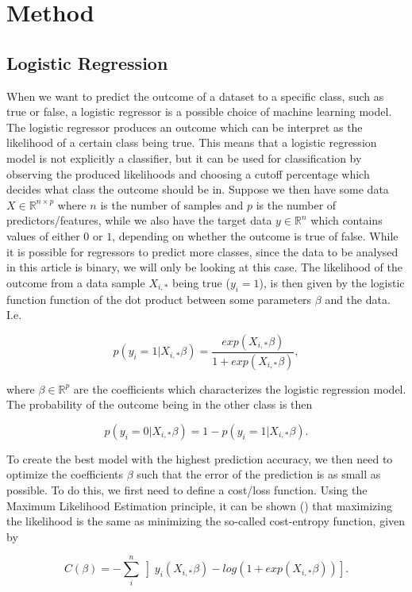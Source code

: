 \documentclass[a4paper,10pt,english]{article}
\begin{document}
\section{Method}

\subsection{Logistic Regression}

When we want to predict the outcome of a dataset to a specific class, such as true or false, a logistic regressor is a possible choice of machine learning model. The logistic regressor produces an outcome which can be interpret as the likelihood of a certain class being true. This means that a logistic regression model is not explicitly a classifier, but it can be used for classification by observing the produced likelihoods and choosing a cutoff percentage which decides what class the outcome should be in. Suppose we then have some data $X \in \mathbb{R}^{n \times p}$ where $n$ is the number of samples and $p$ is the number of predictors/features, while we also have the target data $y \in \mathbb{R}^n$ which contains values of either $0$ or $1$, depending on whether the outcome is true of false. While it is possible for regressors to predict more classes, since the data to be analysed in this article is binary, we will only be looking at this case. The likelihood of the outcome from a data sample $X_{i,*}$ being true ($y_i = 1$), is then given by the logistic function function of the dot product between some parameters $\beta$ and the data. I.e.

$$p(y_i = 1|X_{i,*} \beta) = \frac{exp(X_{i,*} \beta)}{1 + exp(X_{i,*} \beta)},$$

where $\beta \in \mathbb{R}^p$ are the coefficients which characterizes the logistic regression model. The probability of the outcome being in the other class is then

$$p(y_i = 0|X_{i,*} \beta) = 1 - p(y_i = 1|X_{i,*} \beta).$$


To create the best model with the highest prediction accuracy, we then need to optimize the coefficients $\beta$ such that the error of the prediction is as small as possible. To do this, we first need to define a cost/loss function. Using the Maximum Likelihood Estimation principle, it can be shown (\cite{MHJ_LogReg}) that maximizing the likelihood is the same as minimizing the so-called cost-entropy function, given by

$$C(\beta) = -\sum_i^n \left] y_i(X_{i,*} \beta) - log(1 + exp(X_{i,*} \beta))\right].$$
\end{document}
